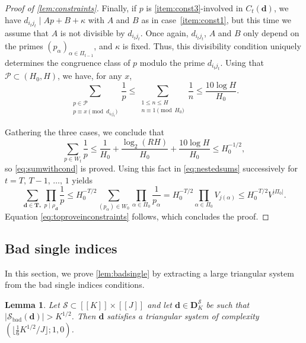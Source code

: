\documentclass[11pt]{amsart}
\newtheorem{lemma}[theorem]{Lemma}
\theoremstyle{definition}
\renewcommand{\leq}{\leqslant}
\newcommand{\sinterval}[1]{[\![#1]\!] }
\newcommand{\abs}[1]{\left|#1\right|}
\newcommand{\primes}{\mathcal{P}}
\renewcommand{\d}{\boldsymbol{d}}
\newcommand{\pcomp}[2]{d_{#1#2}}
\newcommand{\curlyL}{V}
\newcommand{\fprod}[1]{\rho_{#1}}
\newcommand{\pall}{\fprod{\d}}
\newcommand{\s}{\mathcal{S}}
\newcommand{\fancyD}{\mathbf{D}}
\newcommand{\Ds}{\fancyD^{\s}_{\!\repK}}
\newcommand{\solpartial}{W}
\newcommand{\XX}{\mathbf{T}}
\newcommand{\repR}{J}
\newcommand{\repK}{K}
\newcommand{\newK}{\sinterval{K}}
\newcommand{\newR}{\sinterval{J}}
\newcommand{\kbad}{\s_{\mathrm{bad}}(\d)}
\newcommand{\newerKR}{\newK\times\newR}
\newcommand{\tupsize}{R}
\newcommand{\ncond}{T}
\newcommand{\cshift}{\kappa}
\begin{document}
\begin{proof}[Proof of \cref{lem:constraints}]
Finally, if $p$ is \cref{item:const3}-involved in $C_t(\d)$, we have $\pcomp{i_t}{j_t} \mid A p + B + \cshift$ with $A$ and $B$ as in case~\cref{item:const1}, but this time we assume that $A$ is not divisible by $\pcomp{i_t}{j_t}$. Once again, $\pcomp{i_t}{j_t}$, $A$ and $B$ only depend on the primes $(p_{\alpha})_{\alpha\in \Pi_{t-1}}$, and $\cshift$ is fixed. Thus, this divisibility condition uniquely determines the congruence class of $p$ modulo the prime $\pcomp{i_t}{j_t}$. Using that $\primes \subset (H_0, H)$, we have, for any $x$,
\begin{equation*}
	\sum_{\substack{p\in \primes \\ p \equiv x\!\!\!\!\pmod{\pcomp{i_t}{j_t}}}} \frac{1}{p} \leq \sum_{\substack{1\leq n\leq H \\ n\equiv 1\!\!\!\! \pmod{H_0}}} \frac{1}{n} \leq \frac{10\log H}{H_0}.
\end{equation*}

Gathering the three cases, we conclude that 
\begin{equation*}
	\sum_{p\in \solpartial_t} \frac{1}{p} \leq \frac{1}{H_0} + \frac{\log_2(\tupsize H)}{H_0} + \frac{10\log H}{H_0} \leq H_0^{-1/2},
\end{equation*}
so \cref{eq:sumwithcond} is proved. Using this fact in \cref{eq:nestedsums} successively for $t = \ncond, \,\ncond-1,\,\ldots, \, 1$ yields
\begin{equation*}
	\sum_{\d\in\XX_*} \prod_{p\mid \pall} \frac1p \leq H_0^{-\ncond/2}\sum_{(p_{\alpha})\in \solpartial_0} \prod_{\alpha\in \Pi_0} \frac{1}{p_{\alpha}} = H_0^{-\ncond/2} \prod_{\alpha\in \Pi_0} \curlyL_{j(\alpha)} \leq H_0^{-\ncond/2} \curlyL^{\abs{\Pi_0}}.
\end{equation*}
Equation \cref{eq:toproveinconstraints} follows, which concludes the proof. 
\end{proof}




\subsection{Bad single indices}
In this section, we prove \cref{lem:badsingle} by extracting a large triangular system from the bad single indices conditions. 

\begin{lemma}
\label{lem:badanalysis}
Let $\s\subset \newerKR$ and let $\d\in \Ds$ be such that $\abs{\kbad} > \repK^{1/2}$. Then $\d$ satisfies a triangular system of complexity $(\lfloor \tfrac16 \repK^{1/2}/\repR\rfloor; 1, 0)$.
\end{lemma}
\end{document}
